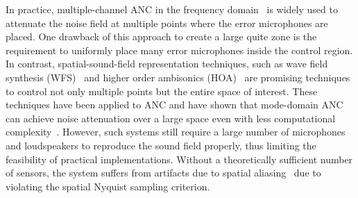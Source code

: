 \documentclass{article}
\begin{document}
%
 In practice, multiple-channel ANC in the frequency domain~\cite{douglas1999fast,bouchard2003computational} is widely used to
attenuate the noise field at multiple points where the error microphones are placed. One drawback of this approach to create a large quite zone is the requirement to uniformly place many error microphones inside the control region. In contrast, spatial-sound-field representation techniques, such as wave field synthesis (WFS)~\cite{berkhout1993acoustic} and higher order ambisonics (HOA)~\cite{poletti2000unified,abhayapala2002theory} are promising techniques to control not only multiple points but the entire space of interest. These techniques have been applied to ANC and have shown that mode-domain ANC can achieve noise attenuation over a large space even with less computational complexity~\cite{morgan1991adaptive,spors2008efficient,zhang2015noise}.
However,  such systems still require a large number of microphones and loudspeakers to reproduce the sound field properly, thus limiting the feasibility of practical implementations.  Without a theoretically sufficient number of sensors, the system suffers from artifacts due to spatial aliasing~\cite{ahrens2012analytic} due to violating the spatial Nyquist sampling criterion. 








\end{document}
